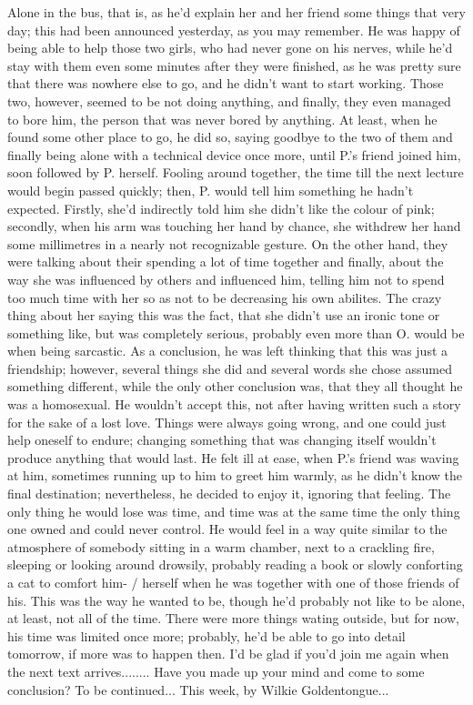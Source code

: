 Alone in the bus, that is, as he'd explain her and her friend some things that very day; this had been announced yesterday, as you may remember. He was happy of being able to help those two girls, who had never gone on his nerves, while he'd stay with them even some minutes after they were finished, as he was pretty sure that there was nowhere else to go, and he didn't want to start working. Those two, however, seemed to be not doing anything, and finally, they even managed to bore him, the person that was never bored by anything. At least, when he found some other place to go, he did so, saying goodbye to the two of them and finally being alone with a technical device once more, until P.'s friend joined him, soon followed by P. herself. Fooling around together, the time till the next lecture would begin passed quickly; then, P. would tell him something he hadn't expected. Firstly, she'd indirectly told him she didn't like the colour of pink; secondly, when his arm was touching her hand by chance, she withdrew her hand some millimetres in a nearly not recognizable gesture. On the other hand, they were talking about their spending a lot of time together and finally, about the way she was influenced by others and influenced him, telling him not to spend too much time with her so as not to be decreasing his own abilites. The crazy thing about her saying this was the fact, that she didn't use an ironic tone or something like, but was completely serious, probably even more than O. would be when being sarcastic. As a conclusion, he was left thinking that this was just a friendship; however, several things she did and several words she chose assumed something different, while the only other conclusion was, that they all thought he was a homosexual. 
He wouldn't accept this, not after having written such a story for the sake of a lost love. 
Things were always going wrong, and one could just help oneself to endure; changing something that was changing itself wouldn't produce anything that would last. 
He felt ill at ease, when P.'s friend was waving at him, sometimes running up to him to greet him warmly, as he didn't know the final destination; nevertheless, he decided to enjoy it, ignoring that feeling. 
The only thing he would lose was time, and time was at the same time the only thing one owned and could never control. 
He would feel in a way quite similar to the atmosphere of somebody sitting in a warm chamber, next to a crackling fire, sleeping or looking around drowsily, probably reading a book or slowly conforting a cat to comfort him- / herself when he was together with one of those friends of his. 
This was the way he wanted to be, though he'd probably not like to be alone, at least, not all of the time. There were more things wating outside, but for now, his time was limited once more; probably, he'd be able to go into detail tomorrow, if more was to happen then. 
I'd be glad if you'd join me again when the next text arrives........
Have you made up your mind and come to some conclusion?
To be continued...
This week, by Wilkie Goldentongue...

